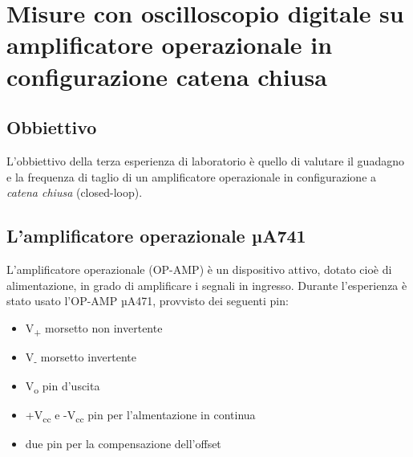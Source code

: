 \chapter{Misure con oscilloscopio digitale su amplificatore operazionale in configurazione catena chiusa}
\label{chap:seconda_prova}

\section*{Obbiettivo}
L'obbiettivo della terza esperienza di laboratorio è quello di valutare il guadagno e la frequenza di taglio di un amplificatore operazionale in configurazione a \emph{catena chiusa} (closed-loop).

\section{L'amplificatore operazionale µA741}
L'amplificatore operazionale (OP-AMP) è un dispositivo attivo, dotato cioè di alimentazione, in grado  di amplificare i segnali in ingresso. Durante l'esperienza è stato usato l'OP-AMP µA471, provvisto dei seguenti pin:
\begin{itemize}
    \item V\textsubscript{+} morsetto non invertente
    \item V\textsubscript{-} morsetto invertente
    \item V\textsubscript{o} pin d'uscita
    \item +V\textsubscript{cc} e -V\textsubscript{cc} pin per l'almentazione in continua
    \item due pin per la compensazione dell'offset
\end{itemize}


